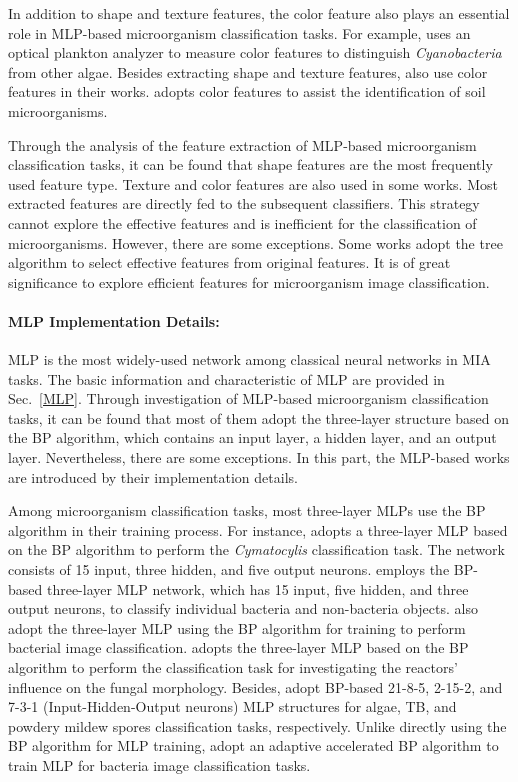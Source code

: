 In addition to shape and texture features, the color feature also plays an essential role in MLP-based microorganism classification tasks. For example, \cite{Balfoort-1992-AIAN} uses an optical plankton analyzer to measure color features to distinguish \emph{Cyanobacteria} from other algae. Besides extracting shape and texture features, \cite{Weller-2005-SCSO,Weller-2007-TSNN} also use color features in their works. \cite{Kruk-2015-CCSI} adopts color features to assist the identification of soil microorganisms.

Through the analysis of the feature extraction of MLP-based microorganism classification tasks, it can be found that shape features are the most frequently used feature type. Texture and color features are also used in some works. Most extracted features are directly fed to the subsequent classifiers. This strategy cannot explore the effective features and is inefficient for the classification of microorganisms. However, there are some exceptions. Some works adopt the tree algorithm to select effective features from original features. It is of great significance to explore efficient features for microorganism image classification.


\paragraph{\textbf{MLP Implementation Details:}}
MLP is the most widely-used network among classical neural networks in MIA tasks. The basic information and characteristic of MLP are provided in Sec.~\ref{MLP}. Through investigation of MLP-based microorganism classification tasks, it can be found that most of them adopt the three-layer structure based on the BP algorithm, which contains an input layer, a hidden layer, and an output layer. Nevertheless, there are some exceptions. In this part, the MLP-based works are introduced by their implementation details.


Among microorganism classification tasks, most three-layer MLPs use the BP algorithm in their training process. For instance, \cite{Culverhouse-1994-ACFS} adopts a three-layer MLP based on the BP algorithm to perform the \emph{Cymatocylis} classification task. The network consists of 15 input, three hidden, and five output neurons. \cite{Blackburn-1998-RDBA} employs the BP-based three-layer MLP network, which has 15 input, five hidden, and three output neurons, to classify individual bacteria and non-bacteria objects. \cite{Xiaojuan-2007-ANBC,Xiaojuan-2007-ANBR} also adopt the three-layer MLP using the BP algorithm for training to perform bacterial image classification. \cite{Gerlach-1998-IRSM} adopts the three-layer MLP based on the BP algorithm to perform the classification task for investigating the reactors' influence on the fungal morphology. Besides, \cite{Mosleh-2012-APSA,Siena-2012-DATB,Danping-2013-IPMS} adopt BP-based 21-8-5, 2-15-2, and 7-3-1 (Input-Hidden-Output neurons) MLP structures for algae, TB, and powdery mildew spores classification tasks, respectively. Unlike directly using the BP algorithm for MLP training, \cite{Xiaojuan-2008-ANWB,Cunshe-2008-ANWB,Xiaojuan-2009-AIBN} adopt an adaptive accelerated BP algorithm to train MLP for bacteria image classification tasks.


